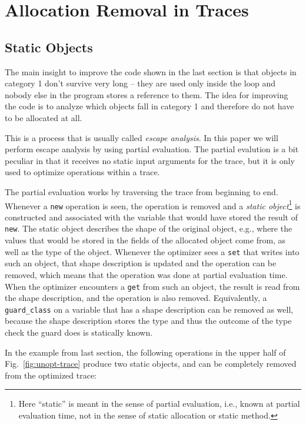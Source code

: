 \documentclass[preprint]{sigplanconf}
\newcommand\ie{i.e.,\xspace}
\newcommand\eg{e.g.,\xspace}
\begin{document}
\section{Allocation Removal in Traces}
\label{sec:statics}

\subsection{Static Objects}

The main insight to improve the code shown in the last section is that objects
in category 1 don't survive very long -- they are used only inside the loop and
nobody else in the program stores a reference to them. The idea for improving
the code is to analyze which objects fall in category 1 and therefore do
not have to be allocated at all.

This is a process that is usually called \emph{escape analysis}. In this paper we will
perform escape analysis by using partial evaluation. The partial evalution is a
bit peculiar in that it receives no static input arguments for the trace,
but it is only used to optimize operations within a trace.

The partial evaluation works by traversing the trace from beginning to end.
Whenever a \lstinline{new} operation is seen, the operation is removed and a \emph{static
object}\footnote{Here ``static'' is meant in the sense of partial
evaluation, \ie known at partial evaluation time, not in the sense of static
allocation or static method.} is constructed and associated with the variable
that would have stored
the result of \lstinline{new}. The static object describes the shape of the
original object, \eg where the values that would be stored in the fields of the
allocated object come from, as well as the type of the object. Whenever the
optimizer sees a \lstinline{set} that writes into such an object, that shape
description is updated and the operation can be removed, which means that the
operation was done at partial evaluation time. When the optimizer encounters a
\lstinline{get} from such an object, the result is read from the shape
description, and the operation is also removed. Equivalently, a
\lstinline{guard_class} on a variable that has a shape description can be removed
as well, because the shape description stores the type and thus the outcome of
the type check the guard does is statically known.

In the example from last section, the following operations in the upper half
of Fig.~\ref{fig:unopt-trace} produce two
static objects, and can be completely removed from the optimized trace:
\end{document}
